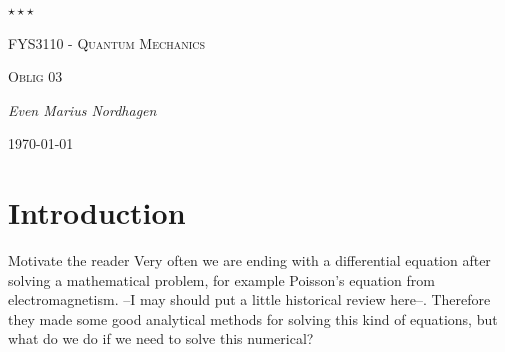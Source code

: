 \documentclass{scrartcl}
\begin{document}
\begin{titlepage}
	\centering
	{\scshape\LARGE $\star\star\star$  \par}
	\vspace{4cm}
	{\scshape\huge FYS3110 - Quantum Mechanics  \par}
	\vspace{1cm}
	{\scshape\Large Oblig 03\par}
	\vspace{2cm}
	{\Large\itshape Even Marius Nordhagen\par}
	\vfill
	{\large \today\par}
\end{titlepage}

\section{Introduction}
Motivate the reader
Very often we are ending with a differential equation after solving a mathematical problem, for example Poisson's equation from electromagnetism. --I may should put a little historical review here--. Therefore they made some good analytical methods for solving this kind of equations, but what do we do if we need to solve this numerical? 
\end{document}
